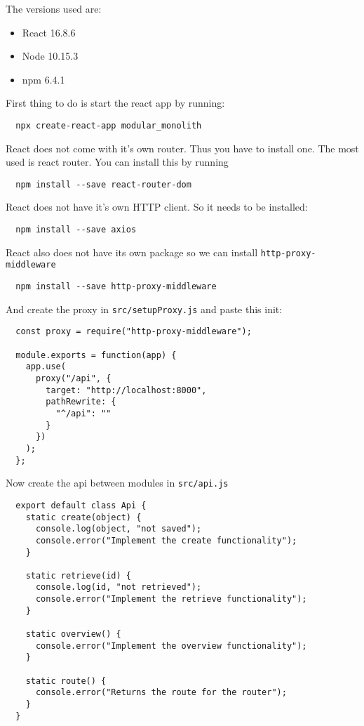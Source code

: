 The versions used are:
\begin{itemize}
  \item React 16.8.6
  \item Node 10.15.3
  \item npm 6.4.1
\end{itemize}

First thing to do is start the react app by running:
\begin{verbatim}
  npx create-react-app modular_monolith
\end{verbatim}

React does not come with it's own router. Thus you have to install one. The most used is react router. You can install this by running
\begin{verbatim}
  npm install --save react-router-dom
\end{verbatim}

React does not have it's own HTTP client. So it needs to be installed:
\begin{verbatim}
  npm install --save axios
\end{verbatim} 

React also does not have its own package so we can install \texttt{http-proxy-middleware}
\begin{verbatim}
  npm install --save http-proxy-middleware
\end{verbatim}

And create the proxy in \texttt{src/setupProxy.js} and paste this init:
\begin{verbatim}
  const proxy = require("http-proxy-middleware");

  module.exports = function(app) {
    app.use(
      proxy("/api", {
        target: "http://localhost:8000",
        pathRewrite: {
          "^/api": ""
        }
      })
    );
  };
\end{verbatim}

Now create the api between modules in \texttt{src/api.js}
\begin{verbatim}
  export default class Api {
    static create(object) {
      console.log(object, "not saved");
      console.error("Implement the create functionality");
    }

    static retrieve(id) {
      console.log(id, "not retrieved");
      console.error("Implement the retrieve functionality");
    }

    static overview() {
      console.error("Implement the overview functionality");
    }

    static route() {
      console.error("Returns the route for the router");
    }
  }
\end{verbatim}

